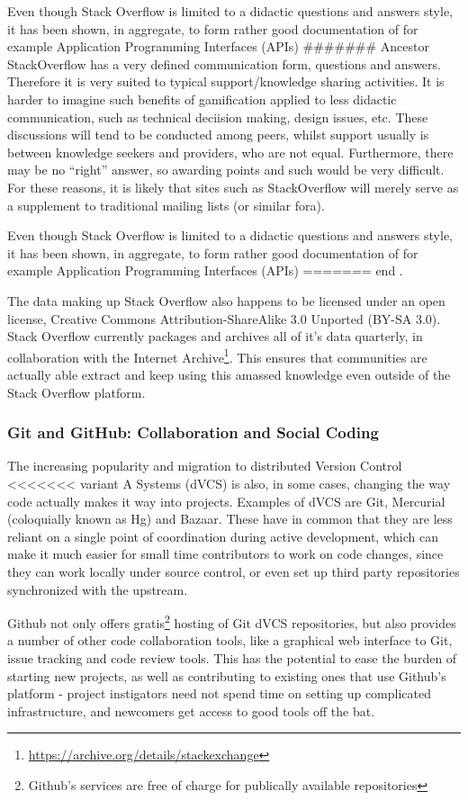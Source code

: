 \documentclass[a4paper,11pt]{article} %
\begin{document}
Even though Stack Overflow is limited to a didactic questions and
answers style, it has been shown, in aggregate, to form rather good
documentation of for example Application Programming Interfaces (APIs)
####### Ancestor
StackOverflow has a very defined communication form, questions and
answers. Therefore it is very suited to typical support/knowledge
sharing activities. It is harder to imagine such benefits of
gamification applied to less didactic communication, such as technical
deciision making, design issues, etc. These discussions will tend to
be conducted among peers, whilst support usually is between knowledge
seekers and providers, who are not equal. Furthermore, there may be no
``right'' answer, so awarding points and such would be very
difficult. For these reasons, it is likely that sites such as
StackOverflow will merely serve as a supplement to traditional mailing
lists (or similar fora).

Even though Stack Overflow is limited to a didactic questions and
answers style, it has been shown, in aggregate, to form rather good
documentation of for example Application Programming Interfaces (APIs)
======= end
\cite{parnin2012crowd}.

The data making up Stack Overflow also happens to be licensed under an open
license, Creative Commons Attribution-ShareAlike 3.0 Unported (BY-SA
3.0). Stack Overflow currently packages and archives all of it's data
quarterly, in collaboration with the Internet
Archive\footnote{\url{https://archive.org/details/stackexchange}}. This
ensures that communities are actually able extract and keep using this
amassed knowledge even outside of the Stack Overflow platform.


\subsubsection{Git and GitHub: Collaboration and Social Coding}
The increasing popularity and migration to distributed Version Control
<<<<<<< variant A
Systems (dVCS) is also, in some cases, changing the way code actually makes
it way into projects. Examples of dVCS are Git, Mercurial (coloquially known
as Hg) and Bazaar. These have in common that they are less reliant on a
single point of coordination during active development, which can make it
much easier for small time contributors to work on code changes, since they
can work locally under source control, or even set up third party
repositories synchronized with the upstream.

Github not only offers gratis\footnote{Github's services are free of charge
  for publically available repositories} hosting of Git dVCS repositories,
but also provides a number of other code collaboration tools, like a
graphical web interface to Git, issue tracking and code review tools. This
has the potential to ease the burden of starting new projects, as well as
contributing to existing ones that use Github's platform - project
instigators need not spend time on setting up complicated infrastructure,
and newcomers get access to good tools off the bat.
\end{document}
